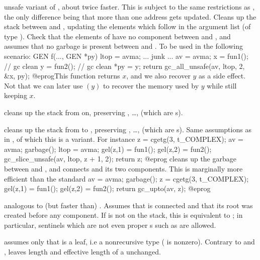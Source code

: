  unsafe
variant of , about twice faster. This is subject to the same
restrictions as , the only difference being that more than
one address gets updated. Cleans up the stack between  and
, updating the  elements which follow  in the
argument list (of type ). Check that the elements of  have
no component between  and , and assumes that no garbage is
present between  and . To be used in the following
scenario:
\bprog
  GEN f(..., GEN *py)
  {
    ltop = avma;
    ... junk ...
    av = avma;
    x = fun1();  // gc clean
    y = fun2();  // gc clean
    *py = y; return gc_all_unsafe(av, ltop, 2, &x, py);
  }
@eprog\noindent This function returns $x$, and we also recover $y$
as a side effect. Not that we can later use $(y)$ to recover the
memory used by $y$ while still keeping $x$.

 cleans up the stack
from  on, preserving , \dots,  (which are
s).

cleans up the stack from  to , preserving ,
\dots,  (which are s). Same assumptions as in
, of which this is a variant. For instance
\bprog
  z = cgetg(3, t_COMPLEX);
  av = avma; garbage(); ltop = avma;
  gel(z,1) = fun1();
  gel(z,2) = fun2();
  gc_slice_unsafe(av, ltop, z + 1, 2);
  return z;
@eprog\noindent
cleans up the garbage between  and , and connects 
and its two components. This is marginally more efficient than the standard
\bprog
  av = avma; garbage();
  z = cgetg(3, t_COMPLEX);
  gel(z,1) = fun1();
  gel(z,2) = fun2(); return gc_upto(av, z);
@eprog\noindent

 analogous to (but faster than)
. Assumes that  is connected and that its root was
created before any component. If  is not on the stack, this is
equivalent to ; in particular, sentinels which are not even
proper s such as  are allowed.

 assumes only that  is a leaf,
i.e a nonrecursive type ( is nonzero). Contrary
to  and ,  leaves length and
effective length of a  unchanged.

